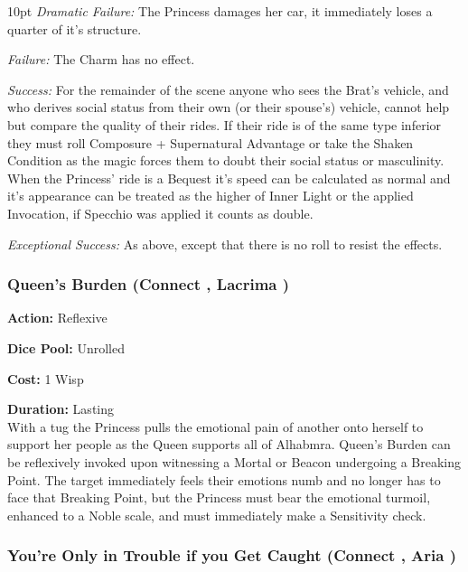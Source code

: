 \begin{myindentpar}{10pt} \emph{Dramatic Failure:} The Princess damages her car, it immediately loses a quarter of it's structure. 
   
    \emph{Failure:} The Charm has no effect.
	
    \emph{Success:} For the remainder of the scene anyone who sees the Brat's vehicle, and who derives social status from their own (or their spouse's) vehicle, cannot help but compare the quality of their rides. If their ride is of the same type inferior they must roll Composure + Supernatural Advantage or take the Shaken Condition as the magic forces them to doubt their social status or masculinity. When the Princess' ride is a Bequest it's speed can be calculated as normal and it's appearance can be treated as the higher of Inner Light or the applied Invocation, if Specchio was applied it counts as double.
	
    \emph{Exceptional Success:} As above, except that there is no roll to resist the effects.\end{myindentpar}

\subsubsection*{Queen's Burden (Connect \textbullet\textbullet, Lacrima \textbullet\textbullet)}

\noindent \textbf{Action:} Reflexive

\noindent \textbf{Dice Pool:} Unrolled

\noindent \textbf{Cost:} 1 Wisp

\noindent \textbf{Duration:} Lasting \\

\noindent With a tug the Princess pulls the emotional pain of another onto herself to support her people as the Queen supports all of Alhabmra. Queen's Burden can be reflexively invoked upon witnessing a Mortal or Beacon undergoing a Breaking Point. The target immediately feels their emotions numb and no longer has to face that Breaking Point, but the Princess must bear the emotional turmoil, enhanced to a Noble scale, and must immediately make a Sensitivity check. 
	
\subsubsection*{You're Only in Trouble if you Get Caught (Connect \textbullet\textbullet, Aria \textbullet\textbullet\textbullet)}

